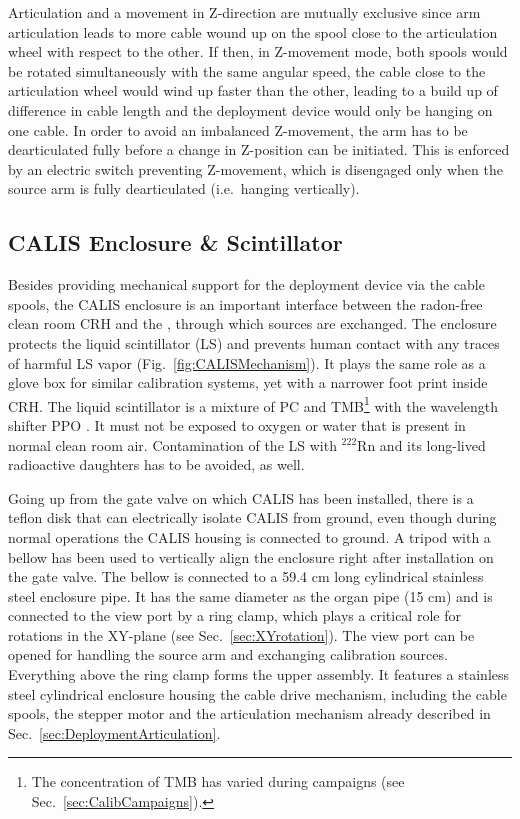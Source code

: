Articulation and a movement in Z-direction are mutually exclusive since arm articulation leads to more cable wound up on the spool close to the articulation wheel with respect to the other. If then, in Z-movement mode, both spools would be rotated simultaneously with the same angular speed, the cable close to the articulation wheel would wind up faster than the other, leading to a build up of difference in cable length and the deployment device would only be hanging on one cable. In order to avoid an imbalanced Z-movement, the arm has to be dearticulated fully before a change in Z-position can be initiated. This is enforced by an electric switch preventing Z-movement, which is disengaged only when the source arm is fully dearticulated (i.e.~hanging vertically). 


\subsection{CALIS Enclosure \& Scintillator}

Besides providing mechanical support for the deployment device via the cable spools, the CALIS enclosure is an important interface between the radon-free clean room CRH and the \lsv, through which sources are exchanged. 
The enclosure protects the liquid scintillator (LS) and prevents human contact with any traces of harmful LS vapor (Fig.~\ref{fig:CALISMechanism}). It plays the same role as a glove box for similar calibration systems, yet with a narrower foot print inside CRH. The liquid scintillator is a mixture of PC and TMB\footnote{The concentration of TMB has varied during campaigns (see Sec.~\ref{sec:CalibCampaigns}).} with the wavelength shifter PPO \cite{Agnes:2015qyz}. %
It must not be exposed to oxygen or water that is present in normal clean room air. Contamination of the LS with $^{222}$Rn and its long-lived radioactive daughters has to be avoided, as well. 

Going up from the gate valve on which CALIS has been installed, there is a teflon disk that can electrically isolate CALIS from ground, even though during normal operations the CALIS housing is connected to ground. A tripod with a bellow has been used to vertically align the enclosure right after installation on the gate valve. The bellow is connected to a 59.4 cm long cylindrical stainless steel enclosure pipe. It has the same diameter as the organ pipe (15 cm) and is connected to the view port by a ring clamp, which plays a critical role for rotations in the XY-plane (see Sec.~\ref{sec:XYrotation}). The view port can be opened for handling the source arm and exchanging calibration sources. Everything above the ring clamp forms the upper assembly. It features a stainless steel cylindrical enclosure housing the cable drive mechanism, including the cable spools, the stepper motor and the articulation mechanism already described in Sec.~\ref{sec:DeploymentArticulation}. 

